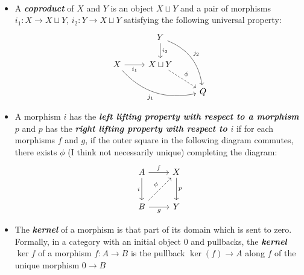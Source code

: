 \begin{defn}
\begin{itemize}
\[\begin{tikzcd}
		\end{tikzcd}\]
		\item A \textbf{\textit{coproduct}} of $X$ and $Y$ is an object $X\sqcup Y$ and a pair of morphisms $i_1:X\to X\sqcup Y$, $i_2:Y\to X\sqcup Y$ satisfying the following universal property:
		\[\begin{tikzcd}
			&Y\arrow[d,"i_2"]\arrow[ddr,bend left,"j_2"]\\
			X\arrow[r,"i_1",swap]\arrow[drr,bend right,swap,"j_1"]&X\sqcup Y\arrow[dr,dashed,"\phi"]\\
			&&Q
		\end{tikzcd}\]
		\item A morphism $i$ has the \textbf{\textit{left lifting property with respect to a morphism $p$}} and $p$ has the \textbf{\textit{right lifting property with respect to $i$}} if for each morphisms $f$ and $g$, if the outer square in the following diagram commutes, there exists $\phi$ (I think not necessarily unique) completing the diagram:
		\[\begin{tikzcd}[row sep=large]
			A\arrow[r,"f"]\arrow[d,"i",swap]&X\arrow[d,"p"]\\
			B\arrow[r,"g",swap]\arrow[ur,dashed,"\phi"]&Y
		\end{tikzcd}\]
		\item The \textbf{\textit{kernel}} of a morphism is that part of its domain which is sent to zero. Formally, in a category with an initial object 0 and pullbacks, the \textbf{\textit{kernel $\ker f$}} of a morphism $f:A\to B$ is the pullback $\ker(f)\to A$ along $f$ of the unique morphism $0\to B$
		

\end{itemize}
\end{defn}
